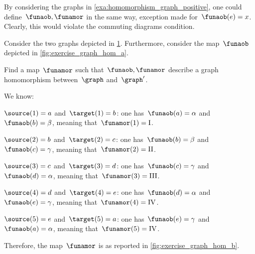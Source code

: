 \begin{example}[Counterexample]
    By considering the graphs in \cref{exa:homomorphism_graph_positive}, one could define~$\funaob,\funamor$ in the same way, exception made for~$\funaob(e)=x$.
    Clearly, this would violate the commuting diagrams condition.
\end{example}

\begin{exercise}
    Consider the two graphs depicted in \cref{fig:ex_graph_hom}.
    Furthermore, consider the map~$\funaob$ depicted in \cref{fig:exercise_graph_hom_a}.
    \begin{figure}[h]
        \centering
        \caption{
            \label{fig:ex_graph_hom}}
    \end{figure}
    \begin{marginfigure}
        \begin{center}
        \end{center}
        \caption{\label{fig:exercise_graph_hom_a}}
    \end{marginfigure}

    Find a map~$\funamor$ such that~$\funaob,\funamor$ describe a graph homomorphism between~$\graph$ and~$\graph'$.
\end{exercise}

\begin{solution}
    We know:
    \begin{compactitem}
        \item $\source(1)=a$ and~$\target(1)=b$: one has~$\funaob(a)=\alpha$ and~$\funaob(b)=\beta$, meaning that~$\funamor(1)=\text{I}$.
        \item $\source(2)=b$ and~$\target(2)=c$: one has~$\funaob(b)=\beta$ and~$\funaob(c)=\gamma$, meaning that~$\funamor(2)=\text{II}$.
        \item $\source(3)=c$ and~$\target(3)=d$: one has~$\funaob(c)=\gamma$ and~$\funaob(d)=\alpha$, meaning that~$\funamor(3)=\text{III}$.
        \item $\source(4)=d$ and~$\target(4)=e$: one has~$\funaob(d)=\alpha$ and~$\funaob(e)=\gamma$, meaning that~$\funamor(4)=\text{IV}$.
        \item $\source(5)=e$ and~$\target(5)=a$: one has~$\funaob(e)=\gamma$ and~$\funaob(a)=\alpha$, meaning that~$\funamor(5)=\text{IV}$.
    \end{compactitem}
    Therefore, the map~$\funamor$ is as reported in \cref{fig:exercise_graph_hom_b}.

    \begin{marginfigure}
        \begin{center}
        \end{center}
        \caption{\label{fig:exercise_graph_hom_b}}
    \end{marginfigure}
\end{solution}
